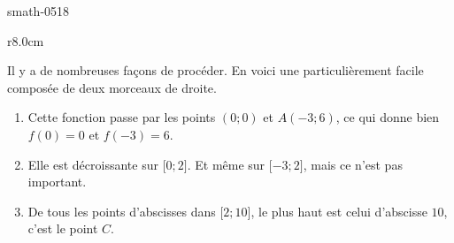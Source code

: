 
\begin{corrige}{smath-0518}

\begin{wrapfigure}{r}{8.0cm}
   \vspace{-0.5cm}        %
   \centering
   
\end{wrapfigure}

    Il y a de nombreuses façons de procéder. En voici une particulièrement facile composée de deux morceaux de droite.
    \begin{enumerate}
        \item
            Cette fonction passe par les points \( (0;0)\) et \( A(-3;6)\), ce qui donne bien \( f(0)=0\) et \( f(-3)=6\).
        \item
            Elle est décroissante sur \( \mathopen[ 0 ;2 \mathclose]\). Et même sur \( \mathopen[ -3 ;2 \mathclose]\), mais ce n'est pas important.
        \item
            De tous les points d'abscisses dans \( \mathopen[ 2 ; 10 \mathclose]\), le plus haut est celui d'abscisse \( 10\), c'est le point \( C\).
    \end{enumerate}

\end{corrige}
